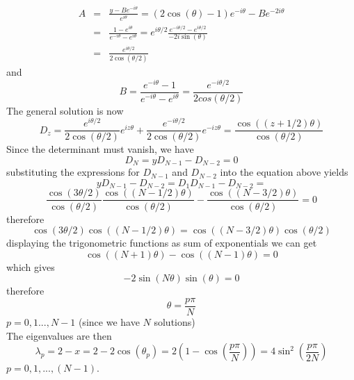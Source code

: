 \documentclass{report}
\begin{document}
 \begin{eqnarray*}
 A & = & \frac{y-Be^{-i\theta}}{e^{i\theta}} = (2\cos(\theta)-1)e^{-i\theta}-Be^{-2i\theta}\\
   & = & \frac{1-e^{i\theta}}{e^{-i\theta}-e^{i\theta}} = e^{i\theta/2}\frac{e^{-i\theta/2}-e^{i\theta/2}}{-2i\sin(\theta)}\\
   & = & \frac{e^{i\theta/2}}{2\cos(\theta/2)}
 \end{eqnarray*}
 and 
 \begin{equation*}
 B=\frac{e^{-i\theta}-1}{e^{-i\theta}-e^{i\theta}}=\frac{e^{-i\theta/2}}{2cos(\theta/2)}
 \end{equation*}
The general solution is now
\begin{equation}
D_z=\frac{e^{i\theta/2}}{2\cos(\theta/2)}e^{iz\theta}+\frac{e^{-i\theta/2}}{2\cos(\theta/2)}e^{-iz\theta}=\frac{\cos((z+1/2)\theta)}{\cos(\theta/2)}
\end{equation}
Since the determinant must vanish, we have 
\begin{equation*}
D_N = yD_{N-1}-D_{N-2}=0
\end{equation*}
substituting the expressions for $D_{N-1}$ and $D_{N-2}$ into the equation above yields 
\begin{equation*}
yD_{N-1}-D_{N-2} = D_1D_{N-1}-D_{N-2} = 
\end{equation*}
\begin{equation*}
\frac{\cos(3\theta/2)}{\cos(\theta/2)}\frac{\cos((N-1/2)\theta)}{\cos(\theta/2)}-\frac{\cos((N-3/2)\theta)}{\cos(\theta/2)}=0
\end{equation*}
therefore 
\begin{equation*}
\cos(3\theta/2)\cos((N-1/2)\theta)=\cos((N-3/2)\theta)\cos(\theta/2)
\end{equation*}
displaying the trigonometric functions as sum of exponentials we can get
\begin{equation*}
\cos((N+1)\theta)-\cos((N-1)\theta)=0
\end{equation*}
which gives 
\begin{equation*}
-2\sin(N\theta)\sin(\theta)=0
\end{equation*}
therefore 
\begin{equation*}
\theta = \frac{p\pi}{N}
\end{equation*}
$p=0,1...,N-1$ (since we have $N$ solutions)\\

The eigenvalues are then
\begin{equation*}
\lambda_p=2-x = 2-2\cos(\theta_p)=2\left(1-\cos(\frac{p\pi}{N})\right)=4\sin^2(\frac{p\pi}{2N})
\end{equation*}
$p=0,1,...,(N-1)$.
\end{document}
